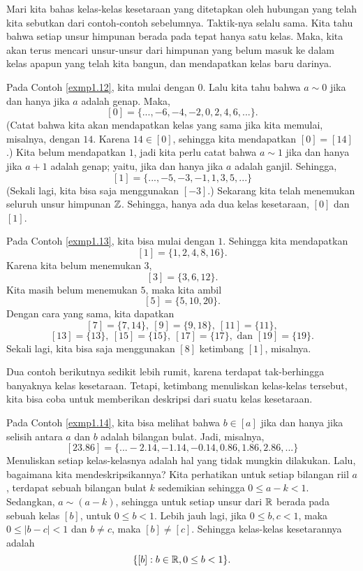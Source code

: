 Mari kita bahas kelas-kelas kesetaraan yang ditetapkan oleh hubungan yang telah kita sebutkan dari contoh-contoh sebelumnya. Taktik-nya selalu sama. Kita tahu bahwa setiap unsur himpunan berada pada tepat hanya satu kelas. Maka, kita akan terus mencari unsur-unsur dari himpunan yang belum masuk ke dalam kelas apapun yang telah kita bangun, dan mendapatkan kelas baru darinya.

\begin{exmp}
Pada Contoh \ref{exmp1.12}, kita mulai dengan $0$. Lalu kita tahu bahwa $a \sim 0$ jika dan hanya jika $a$ adalah genap. Maka,
\[ [0] = \{..., -6, -4, -2, 0, 2, 4, 6, ...\}.
\]
\noindent
(Catat bahwa kita akan mendapatkan kelas yang sama jika kita memulai, misalnya, dengan $14$. Karena $14 \in [0]$, sehingga kita mendapatkan $[0] = [14]$.) Kita belum mendapatkan $1$, jadi kita perlu catat bahwa $a \sim 1$ jika dan hanya jika $a + 1$ adalah genap; yaitu, jika dan hanya jika $a$ adalah ganjil. Sehingga,
\[ [1] = \{..., -5, -3, -1, 1, 3, 5, ...\}
\]
\noindent
(Sekali lagi, kita bisa saja menggunakan $[-3]$.) Sekarang kita telah menemukan seluruh unsur himpunan $\mathbb{Z}$. Sehingga, hanya ada dua kelas kesetaraan, $[0]$ dan $[1]$.
\end{exmp}

\begin{exmp}
Pada Contoh \ref{exmp1.13}, kita bisa mulai dengan $1$. Sehingga kita mendapatkan \[ [1] = \{1, 2, 4, 8, 16\}. \] Karena kita belum menemukan $3$,
\[ [3] = \{3, 6, 12\}. \]
Kita masih belum menemukan $5$, maka kita ambil
\[ [5] = \{ 5, 10, 20\}. \]
Dengan cara yang sama, kita dapatkan 
\[ [7] = \{ 7, 14\},~ [9] = \{9, 18\},~ [11] = \{11\},
\]
\[ [13] = \{13\},~ [15] = \{15\},~ [17] = \{17\}, \text{ dan } [19] = \{19\}.
\]
Sekali lagi, kita bisa saja menggunakan $[8]$ ketimbang $[1]$, misalnya.
\end{exmp}

Dua contoh berikutnya sedikit lebih rumit, karena terdapat tak-berhingga banyaknya kelas kesetaraan. Tetapi, ketimbang menuliskan kelas-kelas tersebut, kita bisa coba untuk memberikan deskripsi dari suatu kelas kesetaraan.

\begin{exmp}
Pada Contoh \ref{exmp1.14}, kita bisa melihat bahwa $b \in [a]$ jika dan hanya jika selisih antara $a$ dan $b$ adalah bilangan bulat. Jadi, misalnya,
\[ [23.86] = \{... -2.14, -1.14, -0.14, 0.86, 1.86, 2.86, ...\}
\]
Menuliskan setiap kelas-kelasnya adalah hal yang tidak mungkin dilakukan. Lalu, bagaimana kita mendeskripsikannya? Kita perhatikan untuk setiap bilangan riil $a$, terdapat sebuah bilangan bulat $k$ sedemikian sehingga $0 \leq a - k < 1$. Sedangkan, $a \sim (a - k)$, sehingga untuk setiap unsur dari $\mathbb{R}$ berada pada sebuah kelas $[b]$, untuk $0 \leq b < 1$. Lebih jauh lagi, jika $0 \leq b,c < 1$, maka $0 \leq |b - c| < 1$ dan $b \neq c$, maka $[b] \neq [c]$. Sehingga kelas-kelas kesetarannya adalah
\[ \{ [b] : b \in \mathbb{R} , 0 \leq b < 1\}.
\]
\end{exmp}

